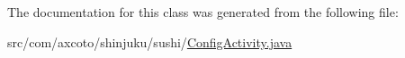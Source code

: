 \-The documentation for this class was generated from the following file\-:\begin{DoxyCompactItemize}
\item 
src/com/axcoto/shinjuku/sushi/\hyperlink{_config_activity_8java}{\-Config\-Activity.\-java}\end{DoxyCompactItemize}
